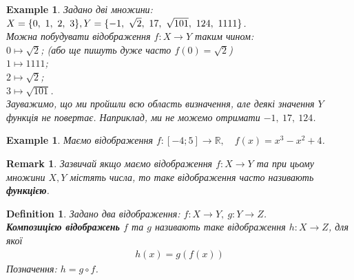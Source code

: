 \documentclass[a4paper, 14pt]{extarticle}
\theoremstyle{theoremdd}
\theoremstyle{theoremdd}
\newtheorem{definition}[theorem]{Definition}
\theoremstyle{theoremdd}
\theoremstyle{theoremdd}
\theoremstyle{theoremdd}
\newtheorem{example}[theorem]{Example}
\theoremstyle{theoremdd}
\theoremstyle{theoremdd}
\theoremstyle{theoremdd}
\theoremstyle{theoremdd}
\theoremstyle{theoremdd}
\theoremstyle{theoremdd}
\newtheorem{remark}[theorem]{Remark}
\theoremstyle{theoremdd}
\theoremstyle{theoremdd}
\theoremstyle{theoremdd}
\theoremstyle{theoremdd}
\begin{document}
	\begin{example}
	Задано дві множини: \\
	$X = \{0,\ 1,\ 2,\ 3 \}, \\ Y = \{-1,\ \sqrt{2},\ 17,\ \sqrt{101},\ 124,\ 1111\}$. \\
	Можна побудувати відображення $f \colon X \to Y$ таким чином:\\
	$0 \mapsto \sqrt{2}$; \quad (або ще пишуть дуже часто $f(0) = \sqrt{2}$)\\
	$1 \mapsto 1111$;\\
	$2 \mapsto \sqrt{2}$;\\
	$3 \mapsto \sqrt{101}$.\\
	Зауважимо, що ми пройшли всю область визначення, але деякі значення $Y$ функція не повертає. Наприклад, ми не можемо отримати $-1,\ 17,\ 124$.
	\end{example}
	
	\begin{example}
	Маємо відображення $f \colon [-4; 5] \to \mathbb{R}, \quad f(x) = x^3-x^2+4$.
	\end{example}
	
	\begin{remark}
	Зазвичай якщо маємо відображення $f \colon X \to Y$ та при цьому множини $X,Y$ містять числа, то таке відображення часто називають \textbf{функцією}.
	\end{remark}
	
	\begin{definition}
	Задано два відображення: $f \colon X \to Y,\ g \colon Y \to Z$.\\
	\textbf{Композицією відображень} $f$ та $g$ називають таке відображення $h \colon X \to Z$, для якої
	\begin{align*}
	h(x) = g(f(x))
	\end{align*}
	Позначення: $h = g \circ f$.
	\begin{figure}[H]
\end{figure}
	\end{definition}
	
\end{document}
